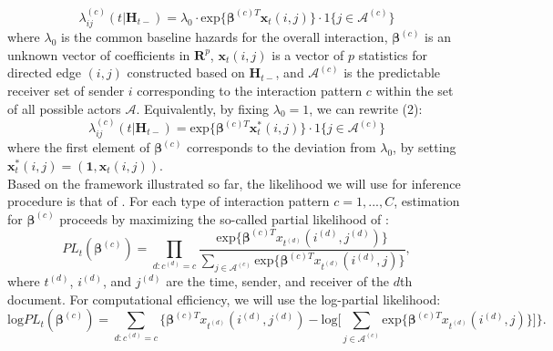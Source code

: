 \documentclass[a4paper]{article}
\begin{document}
\begin{equation}
\lambda^{(c)}_{ij}(t|\boldsymbol{H}_{t-})=\lambda_0\cdot \mbox{exp}\Big\{\boldsymbol{\beta}^{(c)T}\boldsymbol{x}_t(i, j)\Big\}\cdot 1\{j \in \mathcal{A}^{(c)}\}
\end{equation}
where $\lambda_0$ is the common baseline hazards for the overall interaction, $\boldsymbol{\beta}^{(c)}$ is an unknown vector of coefficients in $\boldsymbol{R}^{p}$, $\boldsymbol{x}_t(i, j)$ is a vector of $p$ statistics for directed edge $(i, j)$ constructed based on
$\boldsymbol{H}_{t-}$, and $\mathcal{A}^{(c)}$ is the predictable receiver set of sender $i$ corresponding to the interaction pattern $c$ within the set of all possible actors $\mathcal{A}$. Equivalently, by fixing $\lambda_0=1$, we can rewrite (2): 
\begin{equation}
\lambda^{(c)}_{ij}(t|\boldsymbol{H}_{t-})= \mbox{exp}\Big\{\boldsymbol{\beta}^{(c)T}\boldsymbol{x}^*_t(i, j)\Big\}\cdot 1\{j \in \mathcal{A}^{(c)}\}
\end{equation}
where the first element of $\boldsymbol{\beta}^{(c)}$ corresponds to the deviation from $\lambda_0$, by setting $\boldsymbol{x}^*_t(i, j)=(\boldsymbol{1}, \boldsymbol{x}_t(i, j))$.\\ \newline
Based on the framework illustrated so far, the likelihood we will use for inference procedure is that of  \cite{PerryWolfe2012}. For each type of interaction pattern $c=1,...,C$, estimation for $\boldsymbol{\beta}^{(c)}$ proceeds by maximizing the so-called partial likelihood of \cite{cox1992regression}: 
\begin{equation}
PL_t(\boldsymbol{\beta}^{(c)})=\prod_{d: c^{(d)}=c} \frac{\mbox{exp}\{\boldsymbol{\beta}^{(c)T}x_{t^{(d)}}(i^{(d)}, j^{(d)})\}}{\sum_{j\in \mathcal{A}^{(c)}} \mbox{exp}\{\boldsymbol{\beta}^{(c)T}x_{t^{(d)}}(i^{(d)}, j)\}},
\end{equation}
where $t^{(d)}$, $i^{(d)}$, and $j^{(d)}$ are the time, sender, and receiver
	of the $d$th document. For computational efficiency, we will use the log-partial likelihood:
\begin{equation}
\mbox{log}PL_t(\boldsymbol{\beta}^{(c)})=\sum_{d: c^{(d)}=c} \Big\{\boldsymbol{\beta}^{(c)T}x_{t^{(d)}}(i^{(d)}, j^{(d)})-\mbox{log}\big[\sum_{j\in \mathcal{A}^{(c)}}\mbox{exp}\{\boldsymbol{\beta}^{(c)T}x_{t^{(d)}}(i^{(d)}, j)\}\big]\Big\}.
\end{equation}
\end{document}

